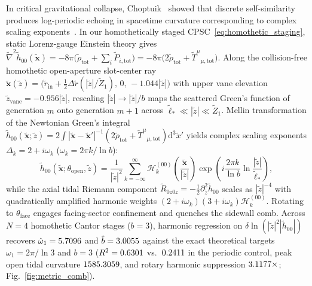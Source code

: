 \documentclass[aps,prd,twocolumn,10pt,showkeys,nofootinbib,floatfix,longbibliography]{revtex4-2}
\newcommand{\dd}{\mathrm{d}}
\begin{document}
In critical gravitational collapse, Choptuik~\cite{choptuik1993} showed that discrete self-similarity produces log-periodic echoing in spacetime curvature corresponding to complex scaling exponents~\cite{sornette1998,calcagni2010}. In our homothetically staged CPSC~\eqref{eq:homothetic_staging}, static Lorenz-gauge Einstein theory gives $\tilde{\nabla}^2 \tilde{h}_{00}(\tilde{\mathbf{x}}) = -8\pi\bigl(\tilde{\rho}_{\mathrm{tot}} + \sum_i \tilde{P}_{i,\mathrm{tot}}\bigr) = -8\pi\bigl(2\tilde{\rho}_{\mathrm{tot}} + \tilde{T}^\mu{}_{\mu,\mathrm{tot}}\bigr)$. Along the collision-free homothetic open-aperture slot-center ray $\tilde{\mathbf{x}}(\tilde{z}) = \bigl(\tilde{r}_{\mathrm{in}} + \frac{1}{2}\Delta\tilde{r}(|\tilde{z}|/\tilde{Z}_1),\, 0,\, -1.044|\tilde{z}|\bigr)$ with upper vane elevation $\tilde{z}_{\mathrm{vane}} = -0.956|\tilde{z}|$, rescaling $|\tilde{z}| \to |\tilde{z}|/b$ maps the scattered Green's function of generation $m$ onto generation $m+1$ across $\tilde{\ell}_* \ll |\tilde{z}| \ll \tilde{Z}_1$. Mellin transformation of the Newtonian Green's integral $\tilde{h}_{00}(\tilde{\mathbf{x}}; \tilde{z}) = 2\int |\tilde{\mathbf{x}}-\tilde{\mathbf{x}}'|^ {-1}(2\tilde{\rho}_{\mathrm{tot}} + \tilde{T}^\mu{}_{\mu,\mathrm{tot}})\dd^3\tilde{x}'$ yields complex scaling exponents $\Delta_k = 2 + i\omega_k$ ($\omega_k = 2\pi k/\ln b$):
\begin{equation}
\tilde{h}_{00}(\tilde{\mathbf{x}}; \theta_{\mathrm{open}}, \tilde{z}) = \frac{1}{|\tilde{z}|^2} \sum_{k=-\infty}^{\infty} \mathcal{H}_k^{(00)}\!\left(\frac{\tilde{\mathbf{x}}}{|\tilde{z}|}\right) \exp\!\left(i \frac{2\pi k}{\ln b} \ln\frac{|\tilde{z}|}{\tilde{\ell}_*}\right),
\label{eq:log_periodic_metric}
\end{equation}
while the axial tidal Riemann component $\tilde{R}_{0z0z} = -\frac{1}{2}\partial_{\tilde{z}}^2 \tilde{h}_{00}$ scales as $|\tilde{z}|^{-4}$ with quadratically amplified harmonic weights $(2 + i\omega_k)(3 + i\omega_k)\mathcal{H}_k^{(00)}$. Rotating to $\theta_{\mathrm{face}}$ engages facing-sector confinement and quenches the sidewall comb. Across $N=4$ homothetic Cantor stages ($b=3$), harmonic regression on $\delta\ln(|\tilde{z}|^2|\tilde{h}_{00}|)$ recovers $\hat{\omega}_1 = 5.7096$ and $\hat{b} = 3.0055$ against the exact theoretical targets $\omega_1 = 2\pi/\ln 3$ and $b = 3$ ($R^2 = 0.6301$ vs.\ $0.2411$ in the periodic control, peak open tidal curvature $1585.3059$, and rotary harmonic suppression $3.1177\times$; Fig.~\ref{fig:metric_comb}).
\end{document}
